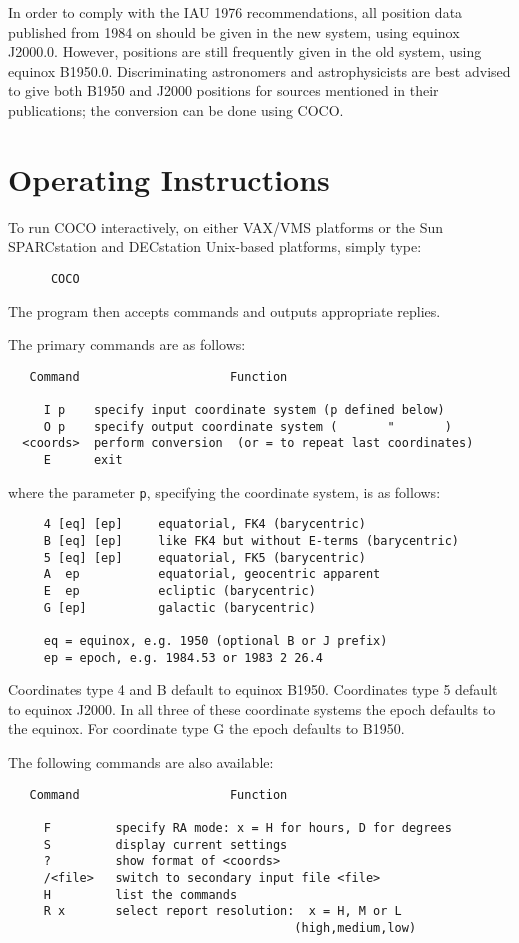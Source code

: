 In order to comply with the IAU 1976 recommendations, all
position data published from 1984 on should be given in
the new system, using equinox J2000.0.
However, positions are still frequently given in
the old system, using equinox B1950.0.
Discriminating astronomers and astrophysicists are best
advised to give both B1950 and J2000
positions for sources mentioned in their publications; the
conversion can be done using COCO.

\section{Operating Instructions}
To run COCO interactively, on either VAX/VMS platforms or
the Sun SPARCstation and DECstation Unix-based platforms, simply type:
\begin{verbatim}
      COCO
\end{verbatim}
The program then accepts commands and outputs appropriate replies.

\goodbreak
The primary commands are as follows:
\begin{verbatim}
   Command                     Function

     I p    specify input coordinate system (p defined below)
     O p    specify output coordinate system (       "       )
  <coords>  perform conversion  (or = to repeat last coordinates)
     E      exit
\end{verbatim}
where the parameter {\tt p}, specifying the coordinate system, is
as follows:
\begin{verbatim}
     4 [eq] [ep]     equatorial, FK4 (barycentric)
     B [eq] [ep]     like FK4 but without E-terms (barycentric)
     5 [eq] [ep]     equatorial, FK5 (barycentric)
     A  ep           equatorial, geocentric apparent
     E  ep           ecliptic (barycentric)
     G [ep]          galactic (barycentric)

     eq = equinox, e.g. 1950 (optional B or J prefix)
     ep = epoch, e.g. 1984.53 or 1983 2 26.4
\end{verbatim}
Coordinates type 4 and B default to equinox B1950. Coordinates type 5 default 
to equinox J2000. In all three of these coordinate systems the epoch defaults 
to the equinox. For coordinate type G the epoch defaults to B1950.

The following commands are also available:
\begin{verbatim}
   Command                     Function

     F         specify RA mode: x = H for hours, D for degrees
     S         display current settings
     ?         show format of <coords>
     /<file>   switch to secondary input file <file>
     H         list the commands
     R x       select report resolution:  x = H, M or L
                                        (high,medium,low)
\end{verbatim}

